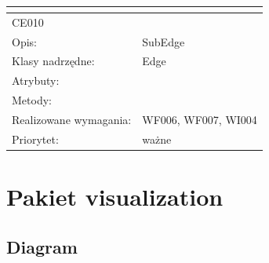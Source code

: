 \documentclass[a4paper,10pt]{article}
\begin{document}
\begin{center}
\begin{longtable}{|m{3cm}|m{9cm}|}
\multicolumn{2}{c}{} \\
 \hline

CE010 &  \\ \hline
Opis: & SubEdge    \\ \hline
Klasy nadrzędne: & Edge    \\ \hline
Atrybuty: & %
 \\ \hline
Metody: & %
  \\ \hline
Realizowane wymagania: & WF006, WF007, WI004 \\ \hline
Priorytet: & ważne  \\ \hline



\end{longtable}

\end{center}

\section{Pakiet visualization }

\subsection{Diagram}

\end{document}
